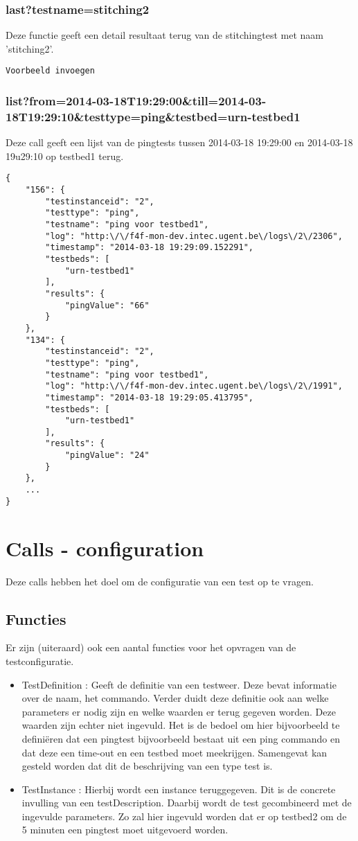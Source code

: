 \subsubsection{last?testname=stitching2}
Deze functie geeft een detail resultaat terug van de stitchingtest met naam 'stitching2'.
\begin{verbatim}
Voorbeeld invoegen
\end{verbatim}

\subsubsection{list?from=2014-03-18T19:29:00\&till=2014-03-18T19:29:10\&testtype=ping\&testbed=urn-testbed1}
Deze call geeft een lijst van de pingtests tussen 2014-03-18 19:29:00 en 2014-03-18 19u29:10 op testbed1 terug.
\begin{verbatim}
{
    "156": {
        "testinstanceid": "2",
        "testtype": "ping",
        "testname": "ping voor testbed1",
        "log": "http:\/\/f4f-mon-dev.intec.ugent.be\/logs\/2\/2306",
        "timestamp": "2014-03-18 19:29:09.152291",
        "testbeds": [
            "urn-testbed1"
        ],
        "results": {
            "pingValue": "66"
        }
    },
    "134": {
        "testinstanceid": "2",
        "testtype": "ping",
        "testname": "ping voor testbed1",
        "log": "http:\/\/f4f-mon-dev.intec.ugent.be\/logs\/2\/1991",
        "timestamp": "2014-03-18 19:29:05.413795",
        "testbeds": [
            "urn-testbed1"
        ],
        "results": {
            "pingValue": "24"
        }
    },
    ...
}
\end{verbatim}

\section{Calls - configuration}
Deze calls hebben het doel om de configuratie van een test op te vragen.

\subsection{Functies}
Er zijn (uiteraard) ook een aantal functies voor het opvragen van de testconfiguratie.
\begin{itemize}
\item TestDefinition : Geeft de definitie van een testweer. Deze bevat informatie over de naam, het commando. Verder duidt deze definitie ook aan welke parameters er nodig zijn en welke waarden er terug gegeven worden. Deze waarden zijn echter niet ingevuld. Het is de bedoel om hier bijvoorbeeld te defini\"eren dat een pingtest bijvoorbeeld bestaat uit een ping commando en dat deze een time-out en een testbed moet meekrijgen. Samengevat kan gesteld worden dat dit de beschrijving van een type test is.
\item TestInstance : Hierbij wordt een instance teruggegeven. Dit is de concrete invulling van een testDescription. Daarbij wordt de test gecombineerd met de ingevulde parameters. Zo zal hier ingevuld worden dat er op testbed2 om de 5 minuten een pingtest moet uitgevoerd worden.
\end{itemize}

